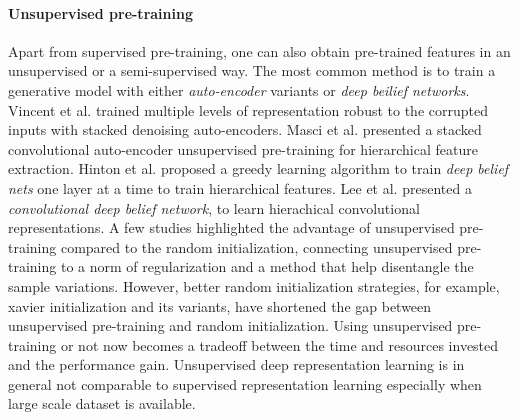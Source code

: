 \paragraph{Unsupervised pre-training}
Apart from supervised pre-training, one can also obtain pre-trained features in an unsupervised or a semi-supervised way.
The most common method is to train a generative model with either \textit{auto-encoder} variants or \textit{deep beilief networks}.
Vincent et al.\cite{vincent2010stacked} trained multiple levels of representation robust to the corrupted inputs with stacked denoising auto-encoders.
Masci et al.\cite{masci2011stacked} presented a stacked convolutional auto-encoder unsupervised pre-training for hierarchical feature extraction.
Hinton et al.\cite{hinton2006fast} proposed a greedy learning algorithm to train \textit{deep belief nets} one layer at a time to train hierarchical features.
Lee et al.\cite{lee2009convolutional} presented a \textit{convolutional deep belief network}, to learn hierachical convolutional representations.
A few studies\cite{erhan2009difficulty,erhan2010does,bengio2012deep} highlighted the advantage of unsupervised pre-training compared to the random initialization, connecting unsupervised pre-training to a norm of regularization and a method that help disentangle the sample variations.
However, better random initialization strategies, for example, xavier initialization\cite{glorot2010understanding} and its variants, have shortened the gap between unsupervised pre-training and random initialization.
Using unsupervised pre-training or not now becomes a tradeoff between the time and resources invested and the performance gain.
Unsupervised deep representation learning is in general not comparable to supervised representation learning especially when large scale dataset is available.

